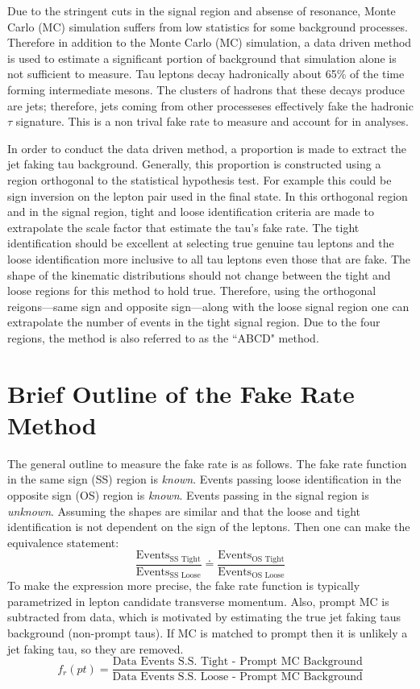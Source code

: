 
Due to the stringent cuts in the signal region and absense of resonance, Monte Carlo (MC) simulation suffers from low statistics for some background processes.  
Therefore in addition to the Monte Carlo (MC) simulation, a data driven method is used to estimate a significant portion of background that simulation alone is not sufficient to measure. 
Tau leptons decay hadronically about 65\% of the time forming intermediate mesons. 
The clusters of hadrons that these decays produce are jets; therefore, jets coming from other processeses effectively fake the hadronic $\tau$ signature. This is a non trival fake rate to measure and account for in analyses. 

In order to conduct the data driven method, a proportion is made to extract the jet faking tau background. Generally, this proportion is constructed using a region orthogonal to the statistical hypothesis test. For example this could be sign inversion on the lepton pair used in the final state. In this orthogonal region and in the signal region, tight and loose identification criteria are made to extrapolate the scale factor that estimate the tau's fake rate. 
The tight identification should be excellent at selecting true genuine tau leptons and the loose identification more inclusive to all tau leptons even those that are fake. 
The shape of the kinematic distributions should not change between the tight and loose regions for this method to hold true. 
Therefore, using the orthogonal reigons---same sign and opposite sign---along with the loose signal region one can extrapolate the number of events in the tight signal region. Due to the four regions, the method is also referred to as the ``ABCD" method. 


\section{Brief Outline of the Fake Rate Method}
The general outline to measure the fake rate is as follows.
The fake rate function in the same sign (SS) region is \textit{known}.
Events passing loose identification in the opposite sign (OS) region is \textit{known}.
Events passing in the signal region is \textit{unknown}. 
Assuming the shapes are similar and that the loose and tight identification is not dependent on the sign of the leptons. Then one can make the equivalence statement: 
\begin{equation}
\label{eq:abcd}
\frac{\text{Events}_\text{SS Tight}}{\text{Events}_\text{SS Loose}} \doteq \frac{\text{Events}_\text{OS Tight}}{\text{Events}_\text{OS Loose}}
\end{equation}
To make the expression more precise, the fake rate function is typically parametrized in lepton candidate transverse momentum. 
 Also, prompt MC is subtracted from data, which is motivated by estimating the true jet faking taus background (non-prompt taus). If MC is matched to prompt then it is unlikely a jet faking tau, so they are removed. 
\begin{equation}f_r(pt)=\frac{\text{Data Events S.S. Tight - Prompt MC Background}}{\text{Data Events S.S. Loose - Prompt MC Background}}\end{equation} 

